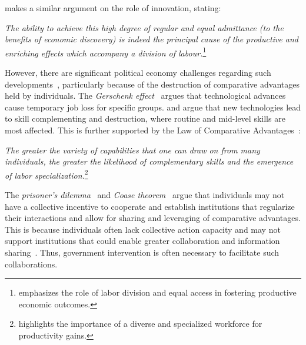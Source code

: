 {\citet{smith2002inquiry} makes a similar argument on the role of innovation, stating:
\begin{myquotation}
    \emph{The ability to achieve this high degree of regular and equal admittance (to the benefits of economic discovery) is indeed the principal cause of the productive and enriching effects which accompany a division of labour.}\footnote{\citet{smith2002inquiry} emphasizes the role of labor division and equal access in fostering productive economic outcomes.}
\end{myquotation}

However, there are significant political economy challenges regarding such developments~\citep{TechWorkChallenges2025}, particularly because of the destruction of comparative advantages held by individuals.
The \emph{Gerschenk effect}~\citep{autor2003skill} argues that technological advances cause temporary job loss for specific groups. 
\citet{Friedman1957ConsistencyOT} and \citet{andot2023artificial} argue that new technologies lead to skill complementing and destruction, where routine and mid-level skills are most affected.
This is further supported by the Law of Comparative Advantages~\citep{smith2002inquiry}:
\begin{myquotation}
    \emph{The greater the variety of capabilities that one can draw on from many individuals, the greater the likelihood of complementary skills and the emergence of labor specialization.}\footnote{\citet{smith2002inquiry} highlights the importance of a diverse and specialized workforce for productivity gains.}
\end{myquotation}

The \emph{prisoner's dilemma}~\citep{poundstone2011prisoner} and \emph{Coase theorem}~\citep{coase2013problem} argue that individuals may not have a collective incentive to cooperate and establish institutions that regularize their interactions and allow for sharing and leveraging of comparative advantages.
This is because individuals often lack collective action capacity and may not support institutions that could enable greater collaboration and information sharing~\citep{buchanan1965calculus, olson2012logic, ostrom1990governing}.
Thus, government intervention is often necessary to facilitate such collaborations.

}
